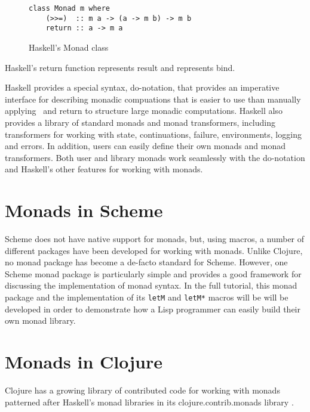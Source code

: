 \documentclass[natbib,10pt]{sigplanconf}
\begin{document}
\begin{figure}
\begin{center}
\begin{verbatim}
class Monad m where
    (>>=)  :: m a -> (a -> m b) -> m b
    return :: a -> m a
\end{verbatim}
\end{center}
\caption{Haskell's Monad class}
\label{fig-Haskell-Monad-class}
\end{figure}

Haskell's {\mono return} function represents {\mono result} and
\hbind \linebreak represents {\mono bind}.

Haskell provides a special syntax, {\mono do}-notation, that provides
an imperative interface for describing monadic compuations that is
easier to use than manually applying \hbind \ and {\mono return}
to structure large monadic computations. Haskell also provides a
library of standard monads and monad transformers, including
transformers for working with state, continuations, failure,
environments, logging and errors.  In addition, users can easily
define their own monads and monad transformers. Both user and
library monads work seamlessly with the {\mono do}-notation and
Haskell's other features for working with monads.

\section{Monads in Scheme}

Scheme does not have native support for monads, but, using macros,
a number of different packages have been developed for working 
with monads. Unlike Clojure, no monad package has become a de-facto
standard for Scheme. However, one Scheme monad package \citep{scheme-monads} 
is particularly simple and provides a good framework for discussing 
the implementation of monad syntax. In the full tutorial, this monad 
package and the implementation of its {\tt letM} and {\tt letM*} macros
will be will be developed in order to demonstrate how a Lisp 
programmer can easily build their own monad library.

\section{Monads in Clojure}

Clojure has a growing library of contributed code for working with
monads patterned after Haskell's monad libraries in its
clojure.contrib.monads library \citep{clojure-monads1, clojure-monads2}.
\end{document}
